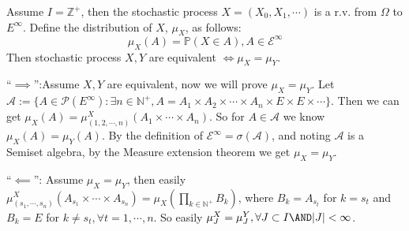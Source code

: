 \documentclass{ctexart}
\begin{document}
\begin{problem}\label{pro:6}
	Assume \(I=\mathbb{Z}^+\), then the stochastic process \(X=(X_0,X_1,\cdots)\) is a r.v. from \(\Omega\) to \(E^\infty\).
	Define the distribution of \(X\), \(\mu_X\), as follows:
	\[
		\mu_X(A)=\mathbb{P}(X \in A),A \in \mathscr{E}^\infty
	\]
	Then stochastic process \(X,Y\) are equivalent \(\iff \mu_X=\mu_Y\).
\end{problem}
\begin{solution}
	``\(\implies\)'':Assume \(X,Y\) are equivalent, now we will prove \(\mu_X=\mu_Y\).
	Let \(\mathscr{A}:=\{A \in \mathscr{P}(E^\infty):\exists n \in \mathbb{N}^+,A=A_1 \times A_2 \times \cdots \times A_n \times E \times E \times \cdots\}\).
	Then we can get \(\mu_X(A)=\mu^X_{(1,2,\cdots,n)}(A_1 \times \cdots \times A_n)\).
	So for \(A \in \mathscr{A}\) we know \(\mu_X(A)=\mu_Y(A)\).
	By the definition of \(\mathscr{E}^\infty=\sigma(\mathscr{A})\),
	and noting \(\mathscr{A}\) is a Semiset algebra, by the Measure extension theorem we get
	\(\mu_X=\mu_Y\).

	``\(\impliedby\)'': Assume \(\mu_X=\mu_Y\), then easily
	\(\mu^X_{(s_1,\cdots,s_n)}(A_{s_1} \times \cdots \times A_{s_n})=\mu_X(\prod_{k \in \mathbb{N}^+} B_k)\),
	where \(B_k=A_{s_t}\) for \(k=s_t\) and \(B_k=E\) for \(k \neq s_t,\forall t=1,\cdots,n\).
	So easily \(\mu^X_{J}=\mu^Y_{J},\forall J \subset I \AND |J|<\infty\).
\end{solution}
\end{document}
